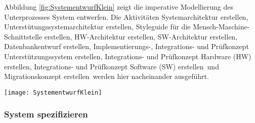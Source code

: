 Abbildung \ref{fig:SystementwurfKlein} zeigt die imperative Modellierung des Unterprozesses \grqq System entwerfen\grqq.\newline
Die Aktivitäten \grqq Systemarchitektur erstellen, Unterstütungssystemarchitektur erstellen, Styleguide für die Mensch-Maschine-Schnittstelle erstellen, HW-Architektur erstellen, SW-Architektur erstellen, Datenbankentwurf erstellen, Implementierungs-, Integrations- und Prüfkonzept Unterstützungssystem erstellen, Integrations- und Prüfkonzept Hardware (HW) erstellen, Integrations- und Prüfkonzept Software (SW) erstellen\grqq \ und \grqq Migrationskonzept erstellen\grqq \ werden hier nacheinander ausgeführt.
\begin{sidewaysfigure}[!htbp]
\begin{center}
  \texttt{[image: SystementwurfKlein]} %
  \caption{System entwerfen V-Modell - imperativ}
  \label{fig:SystementwurfKlein}
\end{center}
\end{sidewaysfigure}


\subsubsection{System spezifizieren}

